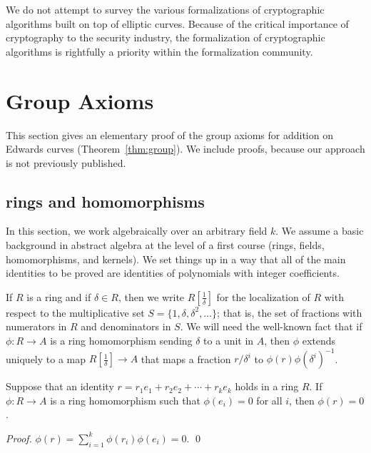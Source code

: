 \documentclass{llncs}
\newcommand{\f}[1]{\frac{1}{#1}}
\begin{document}
We do not attempt to survey the various formalizations of
cryptographic algorithms built on top of elliptic curves.  Because of
the critical importance of cryptography to the security industry, the
formalization of cryptographic algorithms is rightfully a priority
within the formalization community.

\section{Group Axioms}\label{sec:axiom}

This section gives an elementary proof of the group axioms for
addition on Edwards curves (Theorem~\ref{thm:group}).  We include
proofs, because our approach is not previously published.



\subsection{rings and homomorphisms}

In this section, we work algebraically over an arbitrary field $k$.
We assume a basic background in abstract algebra at the level of
a first course (rings, fields, homomorphisms, and kernels).  We set
things up in a way that all of the main identities to be proved are
identities of polynomials with integer coefficients.

If $R$ is a ring 
and if $\delta\in R$, then we write $R[\f{\delta}]$ for
the localization of $R$ with respect to the multiplicative set
$S=\{1,\delta,\delta^2,\ldots\}$; that is, the set of 
fractions with numerators in $R$ and denominators in $S$.  We
will need the well-known fact that if $\phi:R\to A$ is a ring
homomorphism sending $\delta$ to a unit in $A$, then $\phi$ extends
uniquely to a map $R[\f{\delta}]\to A$ that maps a fraction
$r/\delta^i$ to $\phi(r)\phi(\delta^i)^{-1}$.

\begin{lemma} Suppose that an identity $r = r_1 e_1 +
  r_2 e_2 +\cdots + r_k e_k$ holds in a ring $R$.  If $\phi:R\to A$ is
  a ring homomorphism such that $\phi(e_i) =0$ for all $i$, then
  $\phi(r)=0$.
\end{lemma}

\begin{proof}
$\phi(r) = \sum_{i=1}^k \phi(r_i) \phi(e_i) = 0.$
\qed\end{proof}
\end{document}
